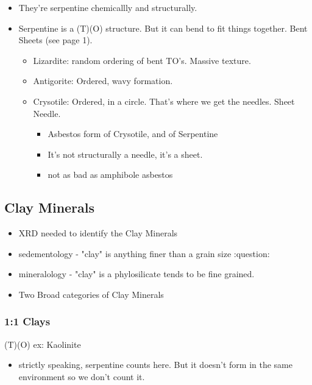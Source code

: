 \documentclass[11pt]{article}
\begin{document}
\begin{itemize}
\begin{itemize}
\item They're serpentine chemicallly and structurally.
\item Serpentine is a (T)(O) structure. But it can bend to fit things together. Bent Sheets (see page 1).
\begin{itemize}
\item Lizardite: random ordering of bent TO's. Massive texture.
\item Antigorite: Ordered, wavy formation.
\item Crysotile: Ordered, in a circle. That's where we get the needles. Sheet Needle.
\begin{itemize}
\item Asbestos form of Crysotile, and of Serpentine
\item It's not structurally a needle, it's a sheet.
\item not as bad as amphibole asbestos
\end{itemize}
\end{itemize}
\end{itemize}
\end{itemize}
\subsection{Clay Minerals}
\label{sec-4-3}
\begin{itemize}
\item XRD needed to identify the Clay Minerals
\item sedementology - "clay" is anything finer than a grain size :question:
\item mineralology - "clay" is a phylosilicate tends to be fine grained.
\item Two Broad categories of Clay Minerals
\end{itemize}
\subsubsection{1:1 Clays}
\label{sec-4-3-1}
(T)(O) 
ex: Kaolinite
\begin{itemize}
\item strictly speaking, serpentine counts here. But it doesn't form in the same environment so we don't count it.
\end{itemize}
\end{document}
